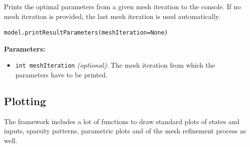 \documentclass[12pt]{article}
\begin{document}
\begin{mdframed}[backgroundcolor=gray!10, roundcorner=10pt,
		linewidth=1pt]
	
	Prints the optimal parameters from a given mesh iteration to the console. If no mesh iteration is provided, the last mesh iteration is used automatically.
 
	\begin{lstlisting}
model.printResultParameters(meshIteration=None)
		\end{lstlisting}
	\label{printResultParameters}
	\textbf{Parameters:}
	\begin{itemize}
		\item \texttt{int meshIteration} \emph{(optional)}: The mesh iteration from which the parameters have to be printed. 
	\end{itemize}

\end{mdframed}
 
\subsection{Plotting}
\label{c:Plotting}
The framework includes a lot of functions to draw standard plots of states and inputs, sparsity patterns, parametric plots and of the mesh refinement process as well. 
\end{document}
